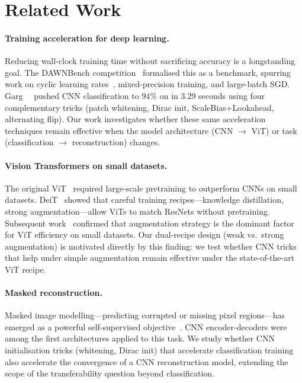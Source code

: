 \section{Related Work}\label{sec:related}

\paragraph{Training acceleration for deep learning.}
Reducing wall-clock training time without sacrificing accuracy is a longstanding goal.
The DAWNBench competition~\cite{coleman2017dawnbench} formalised this as a benchmark, spurring work on cyclic learning rates~\cite{smith2019superconvergence}, mixed-precision training, and large-batch {SGD}.
Garg~\etal~\cite{garg2024cifar10} pushed CNN classification to $94\%$ on \cifar{} in 3.29 seconds using four complementary tricks (patch whitening, Dirac init, ScaleBias+Lookahead, alternating flip).
Our work investigates whether these same acceleration techniques remain effective when the model architecture (CNN $\to$ ViT) or task (classification $\to$ reconstruction) changes.

\paragraph{Vision Transformers on small datasets.}
The original ViT~\cite{dosovitskiy2021vit} required large-scale pretraining to outperform CNNs on small datasets.
DeiT~\cite{touvron2021deit} showed that careful training recipes---knowledge distillation, strong augmentation---allow ViTs to match ResNets without pretraining.
Subsequent work~\cite{touvron2022deit3,liu2021swin} confirmed that augmentation strategy is the dominant factor for ViT efficiency on small datasets.
Our dual-recipe design (weak vs.\ strong augmentation) is motivated directly by this finding: we test whether CNN tricks that help under simple augmentation remain effective under the state-of-the-art ViT recipe.

\paragraph{Masked reconstruction.}
Masked image modelling---predicting corrupted or missing pixel regions---has emerged as a powerful self-supervised objective~\cite{he2022masked}.
CNN encoder-decoders were among the first architectures applied to this task.
We study whether CNN initialisation tricks (whitening, Dirac init) that accelerate classification training also accelerate the convergence of a CNN reconstruction model, extending the scope of the transferability question beyond classification.


